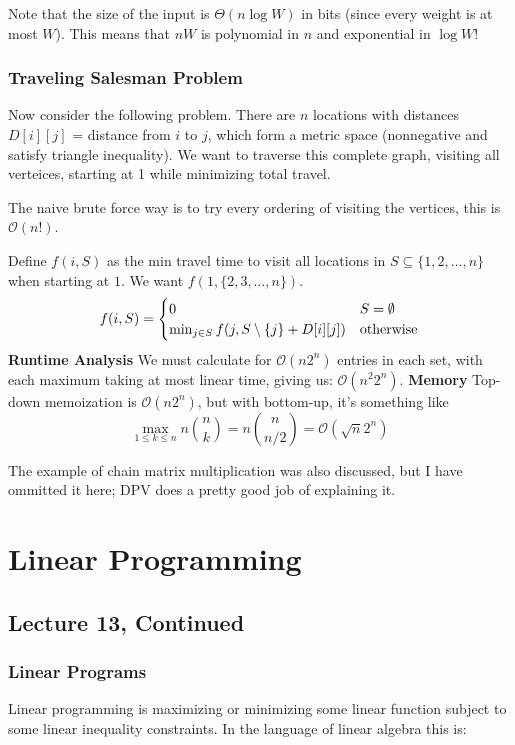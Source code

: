 Note that the size of the input is $\Theta(n \log W)$ in bits (since every weight
is at most $W$). This means that $nW$ is polynomial in $n$ and exponential in $\log W$!

\subsubsection{Traveling Salesman Problem}
Now consider the following problem. There are $n$ locations with distances $D[i][j]$ = distance from $i$ to $j$,
which form a metric space (nonnegative and satisfy triangle inequality). We want to traverse this complete graph, visiting all verteices, starting
at 1 while minimizing total travel.

The naive brute force way is to try every ordering of visiting the vertices, this is $\mathcal{O}(n!)$.

\begin{algothm}[TSP]
    Define $f(i, S)$ as the min travel time to visit all locations in $S \subseteq \{1, 2, \dots, n\}$ when starting at $1$.
    We want $f(1, \{2, 3, \dots, n\})$.
    \[ f(i, S) = \begin{cases} 0 & S = \emptyset \\
        \min_{j \in S} f\qty(j, S \setminus \{j\} + D[i][j]) & \text{otherwise} \end{cases} \]
    \textbf{Runtime Analysis} We must calculate for $\mathcal{O}(n 2^n)$ entries in each set, with each maximum taking at most linear time, giving us:
    $\mathcal{O}(n^2 2^n)$.
    \textbf{Memory} Top-down memoization is $\mathcal{O}(n 2^n)$, but with bottom-up, it's
    something like
    \[ \max_{1 \leq k \leq n} n \binom{n}{k} = n \binom{n}{n/2} = \mathcal{O}(\sqrt{n} 2^n) \]
\end{algothm}

The example of chain matrix multiplication was also discussed, but I have ommitted it here; DPV does a pretty good job of explaining it.

\section{Linear Programming}
\subsection{Lecture 13, Continued}
\subsubsection{Linear Programs}
Linear programming is maximizing or minimizing some linear function subject to some linear inequality constraints.
In the language of linear algebra this is:

